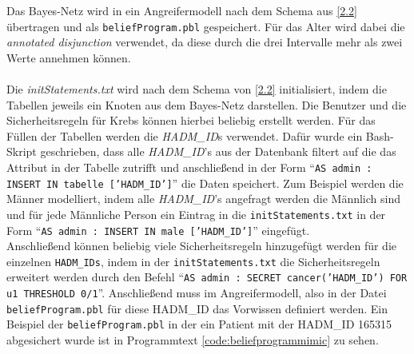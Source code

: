 \documentclass[german,version-2020-11]{uzl-thesis}
\begin{document}
\begin{figure}[ht]
\end{figure}Das Bayes-Netz wird in ein Angreifermodell nach dem Schema aus \ref{2.2} übertragen und als \texttt{beliefProgram.pbl} gespeichert. Für das Alter wird dabei die \textit{annotated disjunction} verwendet, da diese durch die drei Intervalle mehr als zwei Werte annehmen können. \\ \\
Die \textit{initStatements.txt} wird nach dem Schema von \ref{2.2} initialisiert, indem die Tabellen jeweils ein Knoten aus dem Bayes-Netz darstellen. Die Benutzer und die Sicherheitsregeln für Krebs können hierbei beliebig erstellt werden. Für das Füllen der Tabellen werden die \textit{HADM\_ID}s verwendet. Dafür wurde ein Bash-Skript geschrieben, dass alle \textit{HADM\_ID}'s  aus der Datenbank filtert auf die das Attribut in der Tabelle zutrifft und anschließend in der Form \enquote{\texttt{AS admin : INSERT IN tabelle ['HADM\_ID']}} die Daten speichert. Zum Beispiel werden die Männer modelliert, indem alle \textit{HADM\_ID}'s angefragt werden die Männlich sind und für jede Männliche Person ein Eintrag in die \texttt{initStatements.txt} in der Form \enquote{\texttt{AS admin : INSERT IN male ['HADM\_ID']}} eingefügt. \\ 
Anschließend können beliebig viele Sicherheitsregeln hinzugefügt werden für die einzelnen \texttt{HADM\_IDs}, indem in der \texttt{initStatements.txt} die Sicherheitsregeln erweitert werden durch den Befehl \enquote{\texttt{AS admin : SECRET cancer('HADM\_ID') FOR u1 THRESHOLD 0/1}}. Anschließend muss im Angreifermodell, also in der Datei \texttt{beliefProgram.pbl} für diese HADM\_ID das Vorwissen definiert werden. Ein Beispiel der \texttt{beliefProgram.pbl} in der ein Patient mit der HADM\_ID 165315 abgesichert wurde ist in Programmtext  \ref{code:beliefprogrammimic} zu sehen. 
\end{document}
